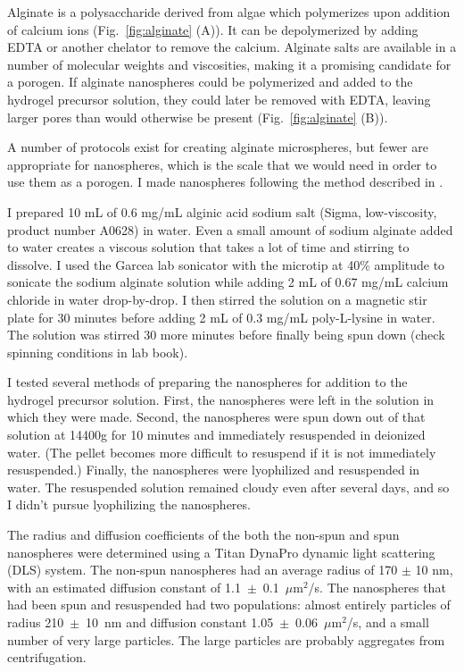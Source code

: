 Alginate is a polysaccharide derived from algae which polymerizes upon addition of calcium ions (Fig.~\ref{fig:alginate} (A)).  It can be depolymerized by adding EDTA or another chelator to remove the calcium.  Alginate salts are available in a number of molecular weights and viscosities, making it a promising candidate for a porogen.  If alginate nanospheres could be polymerized and added to the hydrogel precursor solution, they could later be removed with EDTA, leaving larger pores than would otherwise be present (Fig.~\ref{fig:alginate} (B)).

A number of protocols exist for creating alginate microspheres, but fewer are appropriate for nanospheres, which is the scale that we would need in order to use them as a porogen.  I made nanospheres following the method described in \cite{de03}.

I prepared 10 mL of 0.6 mg/mL alginic acid sodium salt (Sigma, low-viscosity, product number A0628) in water.  Even a small amount of sodium alginate added to water creates a viscous solution that takes a lot of time and stirring to dissolve.  I used the Garcea lab sonicator with the microtip at 40\% amplitude to sonicate the sodium alginate solution while adding 2 mL of 0.67 mg/mL calcium chloride in water drop-by-drop.  I then stirred the solution on a magnetic stir plate for 30 minutes before adding 2 mL of 0.3 mg/mL poly-L-lysine in water.  The solution was stirred 30 more minutes before finally being spun down (check spinning conditions in lab book).

I tested several methods of preparing the nanospheres for addition to the hydrogel precursor solution.  First, the nanospheres were left in the solution in which they were made.  Second, the nanospheres were spun down out of that solution at 14400g for 10 minutes and immediately resuspended in deionized water.  (The pellet becomes more difficult to resuspend if it is not immediately resuspended.) Finally, the nanospheres were lyophilized and resuspended in water.  The resuspended solution remained cloudy even after several days, and so I didn't pursue lyophilizing the nanospheres.

The radius and diffusion coefficients of the both the non-spun and spun nanospheres were determined using a Titan DynaPro dynamic light scattering (DLS) system.  The non-spun nanospheres had an average radius of 170 $\pm$ 10 nm, with an estimated diffusion constant of 1.1~$\pm$~0.1~$\mu$m$^2$/s.  The nanospheres that had been spun and resuspended had two populations: almost entirely particles of radius 210~$\pm$~10~nm and diffusion constant 1.05~$\pm$~0.06~$\mu$m$^2$/s, and a small number of very large particles.  The large particles are probably aggregates from centrifugation.

